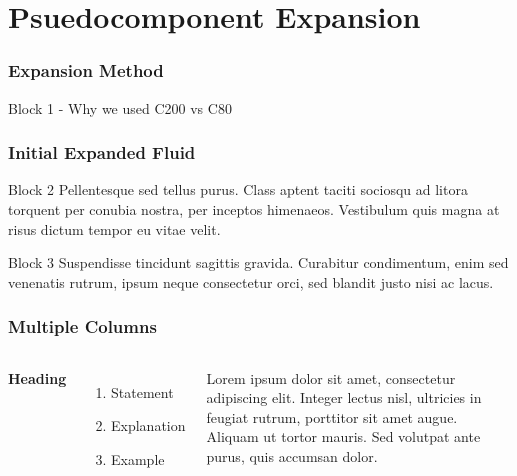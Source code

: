 \documentclass{beamer}
\begin{document}
\section{Psuedocomponent Expansion}
\begin{frame}
\frametitle{Expansion Method}
\begin{block}{Block 1}
 - Why we used C200 vs C80
\end{block}

\end{frame}

\begin{frame}
\frametitle{Initial Expanded Fluid}

\begin{block}{Block 2}
Pellentesque sed tellus purus. Class aptent taciti sociosqu ad litora torquent per conubia nostra, per inceptos himenaeos. Vestibulum quis magna at risus dictum tempor eu vitae velit.
\end{block}

\begin{block}{Block 3}
Suspendisse tincidunt sagittis gravida. Curabitur condimentum, enim sed venenatis rutrum, ipsum neque consectetur orci, sed blandit justo nisi ac lacus.
\end{block}
\end{frame}


\begin{frame}
\frametitle{Multiple Columns}
\begin{columns}[c] %

\textbf{Heading}
\begin{enumerate}
\item Statement
\item Explanation
\item Example
\end{enumerate}

Lorem ipsum dolor sit amet, consectetur adipiscing elit. Integer lectus nisl, ultricies in feugiat rutrum, porttitor sit amet augue. Aliquam ut tortor mauris. Sed volutpat ante purus, quis accumsan dolor.

\end{columns}
\end{frame}
\end{document}
